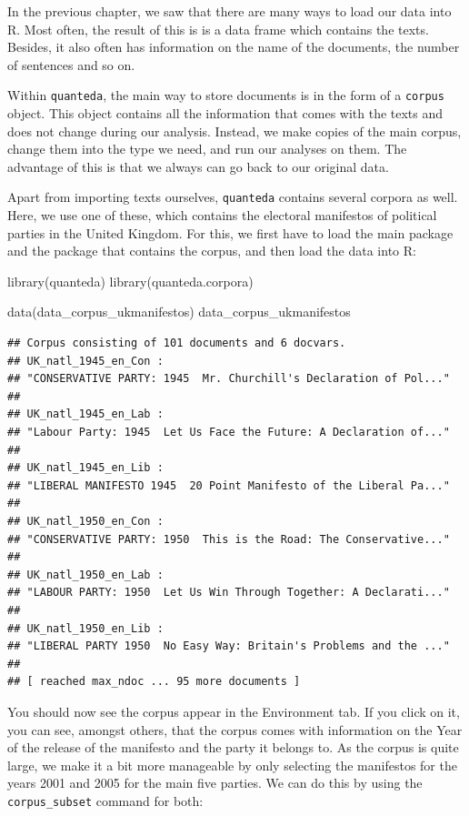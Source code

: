 \documentclass[
]{book}
\newenvironment{Shaded}{\begin{snugshade}}{\end{snugshade}}
\newcommand{\FunctionTok}[1]{\textcolor[rgb]{0.00,0.00,0.00}{#1}}
\newcommand{\NormalTok}[1]{#1}
\begin{document}
In the previous chapter, we saw that there are many ways to load our data into R. Most often, the result of this is is a data frame which contains the texts. Besides, it also often has information on the name of the documents, the number of sentences and so on.

Within \texttt{quanteda}, the main way to store documents is in the form of a \texttt{corpus} object. This object contains all the information that comes with the texts and does not change during our analysis. Instead, we make copies of the main corpus, change them into the type we need, and run our analyses on them. The advantage of this is that we always can go back to our original data.

Apart from importing texts ourselves, \texttt{quanteda} contains several corpora as well. Here, we use one of these, which contains the electoral manifestos of political parties in the United Kingdom. For this, we first have to load the main package and the package that contains the corpus, and then load the data into R:

\begin{Shaded}
\begin{Highlighting}[]
\FunctionTok{library}\NormalTok{(quanteda)}
\FunctionTok{library}\NormalTok{(quanteda.corpora)}

\FunctionTok{data}\NormalTok{(data\_corpus\_ukmanifestos)}
\NormalTok{data\_corpus\_ukmanifestos}
\end{Highlighting}
\end{Shaded}

\begin{verbatim}
## Corpus consisting of 101 documents and 6 docvars.
## UK_natl_1945_en_Con :
## "CONSERVATIVE PARTY: 1945  Mr. Churchill's Declaration of Pol..."
## 
## UK_natl_1945_en_Lab :
## "Labour Party: 1945  Let Us Face the Future: A Declaration of..."
## 
## UK_natl_1945_en_Lib :
## "LIBERAL MANIFESTO 1945  20 Point Manifesto of the Liberal Pa..."
## 
## UK_natl_1950_en_Con :
## "CONSERVATIVE PARTY: 1950  This is the Road: The Conservative..."
## 
## UK_natl_1950_en_Lab :
## "LABOUR PARTY: 1950  Let Us Win Through Together: A Declarati..."
## 
## UK_natl_1950_en_Lib :
## "LIBERAL PARTY 1950  No Easy Way: Britain's Problems and the ..."
## 
## [ reached max_ndoc ... 95 more documents ]
\end{verbatim}

You should now see the corpus appear in the Environment tab. If you click on it, you can see, amongst others, that the corpus comes with information on the Year of the release of the manifesto and the party it belongs to. As the corpus is quite large, we make it a bit more manageable by only selecting the manifestos for the years 2001 and 2005 for the main five parties. We can do this by using the \texttt{corpus\_subset} command for both:
\end{document}

